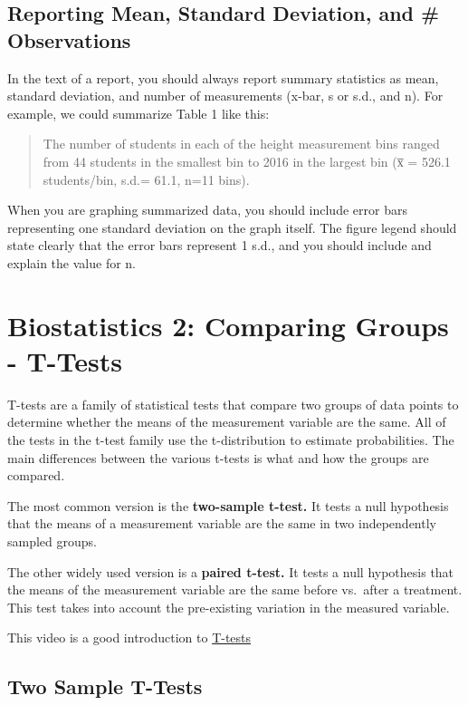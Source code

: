 \documentclass[
]{book}
\begin{document}
\hypertarget{reporting-mean-standard-deviation-and-observations}{%
\section{Reporting Mean, Standard Deviation, and \# Observations}\label{reporting-mean-standard-deviation-and-observations}}

In the text of a report, you should always report summary statistics as mean, standard deviation, and number of measurements (x-bar, s or s.d., and n). For example, we could summarize Table 1 like this:

\begin{quote}
The number of students in each of the height measurement bins ranged from 44 students in the smallest bin to 2016 in the largest bin (x̅ = 526.1 students/bin, s.d.= 61.1, n=11 bins).
\end{quote}

When you are graphing summarized data, you should include error bars representing one standard deviation on the graph itself. The figure legend should state clearly that the error bars represent 1 s.d., and you should include and explain the value for n.~

\hypertarget{compstatsone470}{%
\chapter{Biostatistics 2: Comparing Groups - T-Tests}\label{compstatsone470}}

T-tests are a family of statistical tests that compare two groups of data points to determine whether the means of the measurement variable are the same. All of the tests in the t-test family use the t-distribution to estimate probabilities. The main differences between the various t-tests is what and how the groups are compared.

The most common version is the \textbf{two-sample t-test.} It tests a null hypothesis that the means of a measurement variable are the same in two independently sampled groups.

The other widely used version is a \textbf{paired t-test.} It tests a null hypothesis that the means of the measurement variable are the same before vs.~after a treatment. This test takes into account the pre-existing variation in the measured variable.

This video is a good introduction to \href{https://youtu.be/AGh66ZPpOSQ}{T-tests}

\hypertarget{two-sample-t-tests}{%
\section{Two Sample T-Tests}\label{two-sample-t-tests}}
\end{document}

